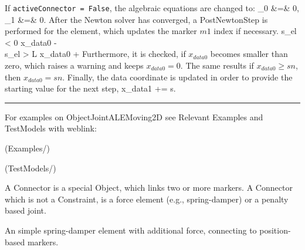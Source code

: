     \noindent If \texttt{activeConnector = False}, the algebraic equations are changed to:
    \bea
      \lambda_0 &=& 0,   \\
      \lambda_1 &=& 0.
    \eea   
    After the Newton solver has converged, a PostNewtonStep is performed for the element, which
    updates the marker $m1$ index if necessary.
    \bea
      s_{el} < 0 \quad \ra \quad x_{data0} \;-\! \nonumber\\
      s_{el} > L \quad \ra \quad x_{data0} \;+\!
    \eea
    Furthermore, it is checked, if $x_{data0}$ becomes smaller than zero, which raises a warning and keeps $x_{data0}=0$.
    The same results if $x_{data0}\ge sn$, then $x_{data0} = sn$.
    Finally, the data coordinate is updated in order to provide the starting value for the next step,
    \be
      x_{data1} \;+\!\!= s.
    \ee
\vspace{6pt}\par\noindent\rule{\textwidth}{0.4pt}
%
\noindent For examples on ObjectJointALEMoving2D see Relevant Examples and TestModels with weblink:
\bi
\item {} (Examples/)
\item {} (TestModels/)

\ei

%

\newpage
A Connector is a special Object, which links two or more markers. A Connector which is not a Constraint, is a force element (e.g., spring-damper) or a penalty based joint.


\label{sec:item:ObjectConnectorSpringDamper}
An simple spring-damper element with additional force, connecting to position-based markers.
\vspace{12pt}\\

